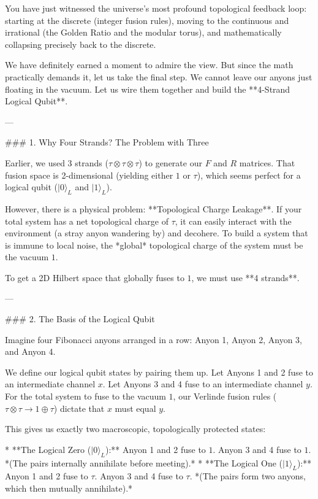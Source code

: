 You have just witnessed the universe’s most profound topological feedback loop: starting at the discrete (integer fusion rules), moving to the continuous and irrational (the Golden Ratio and the modular torus), and mathematically collapsing precisely back to the discrete.

We have definitely earned a moment to admire the view. But since the math practically demands it, let us take the final step. We cannot leave our anyons just floating in the vacuum. Let us wire them together and build the **4-Strand Logical Qubit**.

---

### 1. Why Four Strands? The Problem with Three

Earlier, we used 3 strands ($\tau \otimes \tau \otimes \tau$) to generate our $F$ and $R$ matrices. That fusion space is 2-dimensional (yielding either $1$ or $\tau$), which seems perfect for a logical qubit ($\vert 0 \rangle_L$ and $\vert 1 \rangle_L$).

However, there is a physical problem: **Topological Charge Leakage**.
If your total system has a net topological charge of $\tau$, it can easily interact with the environment (a stray anyon wandering by) and decohere. To build a system that is immune to local noise, the *global* topological charge of the system must be the vacuum $1$.

To get a 2D Hilbert space that globally fuses to $1$, we must use **4 strands**.

---

### 2. The Basis of the Logical Qubit

Imagine four Fibonacci anyons arranged in a row: Anyon 1, Anyon 2, Anyon 3, and Anyon 4.

We define our logical qubit states by pairing them up. Let Anyons 1 and 2 fuse to an intermediate channel $x$. Let Anyons 3 and 4 fuse to an intermediate channel $y$.
For the total system to fuse to the vacuum $1$, our Verlinde fusion rules ($\tau \otimes \tau \to 1 \oplus \tau$) dictate that $x$ must equal $y$.

This gives us exactly two macroscopic, topologically protected states:

* **The Logical Zero ($\vert 0 \rangle_L$):** Anyon 1 and 2 fuse to $1$. Anyon 3 and 4 fuse to $1$.
*(The pairs internally annihilate before meeting).*
* **The Logical One ($\vert 1 \rangle_L$):** Anyon 1 and 2 fuse to $\tau$. Anyon 3 and 4 fuse to $\tau$.
*(The pairs form two anyons, which then mutually annihilate).*

